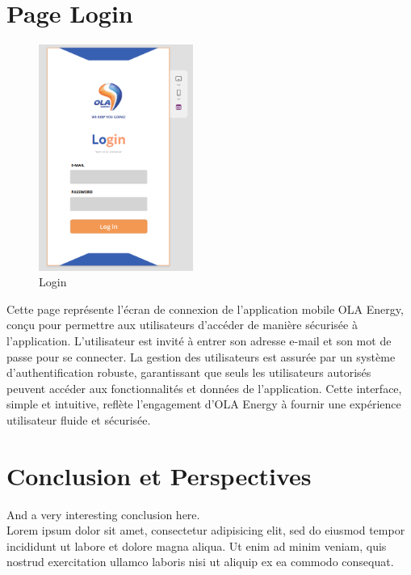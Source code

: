 \documentclass[a4paper, oneside, 12pt, final]{extreport}
\begin{document}
\chapter{Page Login}
\begin{figure}[h]
    \centering
    \includegraphics[width=0.45\textwidth]{Login.png} %
    \caption{Login}
    \label{fig:Login}
\end{figure}
Cette page représente l'écran de connexion de l'application mobile OLA Energy, conçu pour permettre aux utilisateurs d'accéder de manière sécurisée à l'application. L'utilisateur est invité à entrer son adresse e-mail et son mot de passe pour se connecter. La gestion des utilisateurs est assurée par un système d'authentification robuste, garantissant que seuls les utilisateurs autorisés peuvent accéder aux fonctionnalités et données de l'application. Cette interface, simple et intuitive, reflète l'engagement d'OLA Energy à fournir une expérience utilisateur fluide et sécurisée.
\chapter*{Conclusion et Perspectives}
\label{chap:conclusion}
%
  And a very interesting conclusion here\@. ~\\
  Lorem ipsum dolor sit amet, consectetur adipisicing elit, sed do eiusmod
  tempor incididunt ut labore et dolore magna aliqua. Ut enim ad minim veniam,
  quis nostrud exercitation ullamco laboris nisi ut aliquip ex ea commodo
  consequat.

\newpage
\appendix
{}
\end{document}
